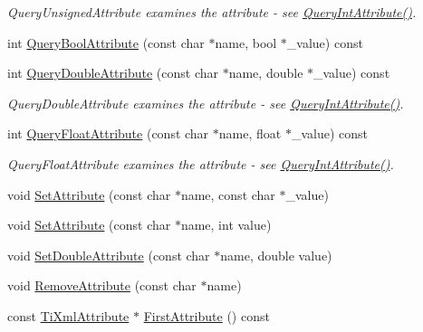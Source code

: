 \begin{DoxyCompactItemize}
\begin{DoxyCompactList}\small\item\em Query\+Unsigned\+Attribute examines the attribute -\/ see \hyperlink{classTiXmlElement_aea0bfe471380f281c5945770ddbf52b9}{Query\+Int\+Attribute()}. \end{DoxyCompactList}\item 
int \hyperlink{classTiXmlElement_af4a1d3f88c28eb0f3115dc39ebd83fff}{Query\+Bool\+Attribute} (const char $\ast$name, bool $\ast$\+\_\+value) const 
\item 
int \hyperlink{classTiXmlElement_a898d7730ecc341f0bffc7a9dadbf1ce7}{Query\+Double\+Attribute} (const char $\ast$name, double $\ast$\+\_\+value) const \hypertarget{classTiXmlElement_a898d7730ecc341f0bffc7a9dadbf1ce7}{}\label{classTiXmlElement_a898d7730ecc341f0bffc7a9dadbf1ce7}

\begin{DoxyCompactList}\small\item\em Query\+Double\+Attribute examines the attribute -\/ see \hyperlink{classTiXmlElement_aea0bfe471380f281c5945770ddbf52b9}{Query\+Int\+Attribute()}. \end{DoxyCompactList}\item 
int \hyperlink{classTiXmlElement_aa04d3af11601ef5a5f88295203a843be}{Query\+Float\+Attribute} (const char $\ast$name, float $\ast$\+\_\+value) const \hypertarget{classTiXmlElement_aa04d3af11601ef5a5f88295203a843be}{}\label{classTiXmlElement_aa04d3af11601ef5a5f88295203a843be}

\begin{DoxyCompactList}\small\item\em Query\+Float\+Attribute examines the attribute -\/ see \hyperlink{classTiXmlElement_aea0bfe471380f281c5945770ddbf52b9}{Query\+Int\+Attribute()}. \end{DoxyCompactList}\item 
void \hyperlink{classTiXmlElement_abf0b3bd7f0e4c746a89ec6e7f101fc32}{Set\+Attribute} (const char $\ast$name, const char $\ast$\+\_\+value)
\item 
void \hyperlink{classTiXmlElement_ace6f4be75e373726d4774073d666d1a7}{Set\+Attribute} (const char $\ast$name, int value)
\item 
void \hyperlink{classTiXmlElement_a0d1dd975d75496778177e35abfe0ec0b}{Set\+Double\+Attribute} (const char $\ast$name, double value)
\item 
void \hyperlink{classTiXmlElement_a56979767deca794376b1dfa69a525b2a}{Remove\+Attribute} (const char $\ast$name)
\item 
const \hyperlink{classTiXmlAttribute}{Ti\+Xml\+Attribute} $\ast$ \hyperlink{classTiXmlElement_a516054c9073647d6cb29b6abe9fa0592}{First\+Attribute} () const \hypertarget{classTiXmlElement_a516054c9073647d6cb29b6abe9fa0592}{}\label{classTiXmlElement_a516054c9073647d6cb29b6abe9fa0592}


\end{DoxyCompactItemize}
